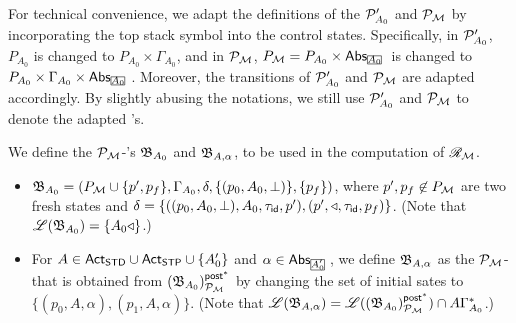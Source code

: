 For technical convenience, we adapt the definitions of the {\WOTrPDS} ${\mathcal{P} }'_{A_0}$ and ${\mathcal{P} }_{\mathcal{M} }$ by incorporating the top stack symbol into the control states. Specifically, in ${\mathcal{P} }'_{A_0}$, $P_{A_0}$ is changed to $P_{A_0} \times \Gamma_{A_0}$, and in ${\mathcal{P} }_{\mathcal{M} }$, $P_\Mm = P_{A_0} \times \abs_{\mhcancel{A_0}}$ is changed to $P_{A_0} \times \Gamma_{A_0} \times \abs_{\mhcancel{A_0}}$.  Moreover, the transitions of ${\mathcal{P} }'_{A_0}$ and ${\mathcal{P} }_{{\mathcal{M} }}$ are adapted accordingly. By slightly abusing the notations, we still use ${\mathcal{P} }'_{A_0}$ and ${\mathcal{P} }_{\mathcal{M} }$ to denote the adapted {\WOTrPDS}'s.

We define the ${\mathcal{P} }_{\mathcal{M} }$-{\WOTrNFA}'s ${\mathfrak{B} }_{A_0}$ and ${\mathfrak{B} }_{A, \alpha}$, to be used in the computation of $\mathscr{R}_{\mathcal{M} }$. 
\begin{itemize}
\item ${\mathfrak{B} }_{A_0} = (P_{\mathcal{M} } \cup \{p', p_f\}, \Gamma_{A_0}, \delta, \{(p_0, A_0, \bot)\}, \{p_f\})$, where $p', p_f \not \in P_{\mathcal{M} }$ are two fresh states and $\delta = \{((p_0, A_0, \bot), A_0, \tau_{\mathsf{id}}, p'), (p', \triangleleft, \tau_{\mathsf{id}}, p_f)\}$. (Note that ${\mathscr{L} }({\mathfrak{B} }_{A_0}) = \{A_0 \triangleleft\}$.)
%
\item For $A \in {\sf Act}_{\sf STD} \cup {\sf Act}_{\sf STP} \cup \{A'_0\}$ and $\alpha \in \abs_{\mhcancel{A'_0}}$, we define ${\mathfrak{B} }_{A, \alpha}$ as the ${\mathcal{P} }_{\mathcal{M} }$-{\WOTrNFA} that is obtained from $({\mathfrak{B} }_{A_0})^{{\mathsf{post} }^*}_{{\mathcal{P} }_{{\mathcal{M} }}}$ by changing the set of initial sates to $\{(p_0, A, \alpha), (p_1, A, \alpha)\}$. (Note that ${\mathscr{L} }({\mathfrak{B} }_{A, \alpha}) = {\mathscr{L} }(({\mathfrak{B} }_{A_0})^{{\mathsf{post} }^*}_{{\mathcal{P} }_{{\mathcal{M} }}}) \cap A \Gamma^*_{A_0}$.)
\end{itemize}

